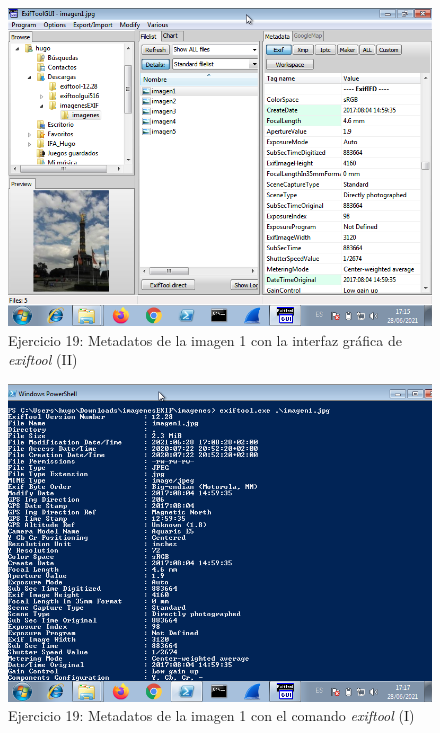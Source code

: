 \documentclass[11pt]{article}
\begin{document}
\begin{figure}[H]
    \caption{Ejercicio 19: Metadatos de la imagen 1 con la interfaz gráfica de \textit{exiftool} (II)}
    \centering
    \includegraphics[scale=0.7]{p03/e19-2.png}
\end{figure}

\begin{figure}[H]
    \caption{Ejercicio 19: Metadatos de la imagen 1 con el comando \textit{exiftool} (I)}
    \centering
    \includegraphics[scale=0.7]{p03/e19-3.png}
\end{figure}
\end{document}
